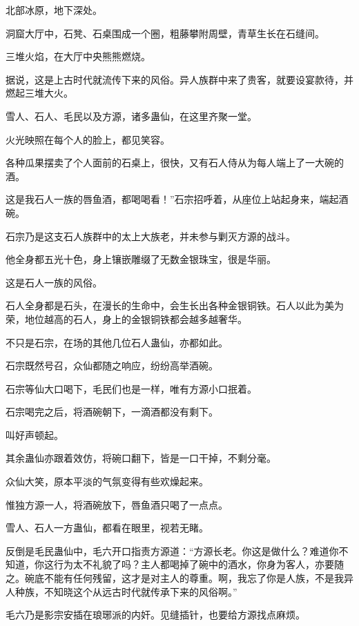 
\begin{this_body}

北部冰原，地下深处。

洞窟大厅中，石凳、石桌围成一个圈，粗藤攀附周壁，青草生长在石缝间。

三堆火焰，在大厅中央熊熊燃烧。

据说，这是上古时代就流传下来的风俗。异人族群中来了贵客，就要设宴款待，并燃起三堆大火。

雪人、石人、毛民以及方源，诸多蛊仙，在这里齐聚一堂。

火光映照在每个人的脸上，都见笑容。

各种瓜果摆卖了个人面前的石桌上，很快，又有石人侍从为每人端上了一大碗的酒。

这是我石人一族的唇鱼酒，都喝喝看！”石宗招呼着，从座位上站起身来，端起酒碗。

石宗乃是这支石人族群中的太上大族老，并未参与剿灭方源的战斗。

他全身都五光十色，身上镶嵌雕缀了无数金银珠宝，很是华丽。

这是石人一族的风俗。

石人全身都是石头，在漫长的生命中，会生长出各种金银铜铁。石人以此为美为荣，地位越高的石人，身上的金银铜铁都会越多越奢华。

不只是石宗，在场的其他几位石人蛊仙，亦都如此。

石宗既然号召，众仙都随之响应，纷纷高举酒碗。

石宗等仙大口喝下，毛民们也是一样，唯有方源小口抿着。

石宗喝完之后，将酒碗朝下，一滴酒都没有剩下。

叫好声顿起。

其余蛊仙亦跟着效仿，将碗口翻下，皆是一口干掉，不剩分毫。

众仙大笑，原本平淡的气氛变得有些欢燥起来。

惟独方源一人，将酒碗放下，唇鱼酒只喝了一点点。

雪人、石人一方蛊仙，都看在眼里，视若无睹。

反倒是毛民蛊仙中，毛六开口指责方源道：“方源长老。你这是做什么？难道你不知道，你这行为太不礼貌了吗？主人都喝掉了碗中的酒水，你身为客人，亦要随之。碗底不能有任何残留，这才是对主人的尊重。啊，我忘了你是人族，不是我异人种族，不知晓这个从远古时代就传承下来的风俗啊。”

毛六乃是影宗安插在琅琊派的内奸。见缝插针，也要给方源找点麻烦。


\end{this_body}
